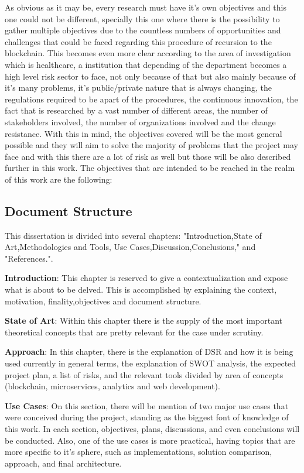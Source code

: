 As obvious as it may be, every research must have it's own objectives and this one could not be different, 
specially this one where there is the possibility to gather multiple objectives due to the countless numbers 
of opportunities and challenges that could be faced regarding this procedure of recursion to the blockchain. This 
becomes even more clear according to the area of investigation which is healthcare, a institution that 
depending of the department becomes a high level risk sector to face, not only because of that but also mainly 
because of it's many problems, it's public/private nature that is always changing, the regulations required 
to be apart of the procedures, the continuous innovation, the fact that is researched by a vast number of 
different areas, the number of stakeholders involved, the number of organizations involved and the change 
resistance. With this in mind, the objectives covered will be the most general possible and they will aim to 
solve the majority of problems that the project may face and with this there are a lot of risk as well but those 
will be also described further in this work. The objectives that are intended to be reached in the realm of this 
work are the following:

\subsection{Document Structure}
This dissertation is divided into several chapters: "Introduction,State of Art,Methodologies and Tools, Use 
Cases,Discussion,Conclusions," and "References.".

\textbf {Introduction}: This chapter is reserved to give a contextualization and expose what is about 
to be delved. This is accomplished by explaining the context, motivation, finality,objectives and document 
structure.

\textbf{State of Art}: Within this chapter there is the supply of the most important theoretical concepts that 
are pretty relevant for the case under scrutiny.

\textbf{Approach}: In this chapter, there is the explanation of DSR and how it is being used currently in general 
terms, the explanation of SWOT analysis, the expected project plan, a list of risks, and the relevant tools 
divided by area of concepts (blockchain, microservices, analytics and web development).

\textbf {Use Cases}: On this section, there will be mention of two major use cases that were conceived during the 
project, standing as the biggest font of knowledge of this work. In each section, objectives, plans, discussions,
and even conclusions will be conducted. Also, one of the use cases is more practical, having topics that are more 
specific to it's sphere, such as implementations, solution comparison, approach, and final architecture.

